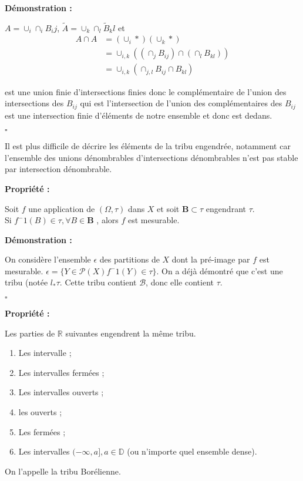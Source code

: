 \documentclass[10pt,a4paper,notitlepage ]{report}
\newcommand{\R}{\mathbb R}
\newcounter{th}
\newenvironment{propriete}[1][]{
	\begin{tcolorbox}
		\textbf{Propriété #1 : }
}
{\end{tcolorbox}}
\newenvironment{demo}[1][]{

	\textbf{Démonstration #1 :}
}{\begin{flushright}
	$\square$
\end{flushright}
}
\begin{document}
\begin{demo}
$A = \cup _ i \cap _i B_ij $, $\tilde A  = \cup_k \cap _ l \tilde B_kl $ et  \\

\begin{align*}
A \cap A &= (\cup _i  * ) ( \cup _ k * ) \\
&= \cup_{i,k} \left( \left( \cap_j B_{ij} \right) \cap \left( \cap_l B_{kl} \right) \right) \\
&= \cup _{i,k} \left( \cap_{j,l} B_{ij} \cap B_{kl} \right) 
\end{align*}

est une union finie d'intersections finies donc le complémentaire de l'union des intersections des $B_{ij}$ qui est l'intersection de l'union des complémentaires des $B_{ij}$ est une intersection finie d'éléments de notre ensemble et donc est dedans. \\

\end{demo}

Il est plus difficile de décrire les éléments de la tribu engendrée, notamment car l'ensemble des unions dénombrables d'intersections dénombrables n'est pas stable par intersection dénombrable. 

\begin{propriete}
Soit $f$ une application de $( \Omega , \tau ) $ dans $ X $ et soit $\mathbf{B} \subset \tau $ engendrant $\tau$. \\
Si $f^-1 (B)\in \tau , \forall B \in \mathbf{B}$ , alors $f$ est mesurable.
\end{propriete}

\begin{demo}
On considère l'ensemble $\epsilon$ des partitions de $X$ dont la pré-image par $f$ est mesurable. $ \epsilon = \lbrace Y \in \mathcal{P} (X) f^-1(Y) \in \tau \rbrace $. 
On a déjà démontré que c'est une tribu (notée $l_* \tau$. Cette tribu contient $\mathcal{B}$, donc elle contient $\tau$. 

\end{demo}

\begin{propriete}
Les parties de $\R$ suivantes engendrent la même tribu.
\begin{enumerate}
\item Les intervalle ;
\item Les intervalles fermées ;
\item Les intervalles ouverts ;
\item les ouverts ;
\item Les fermées ;
\item Les intervalles $( - \infty , a ], a \in \mathbb{D} $ (ou n'importe quel ensemble dense).
\end{enumerate}

On l'appelle la tribu Borélienne.

\end{propriete}
\end{document}

